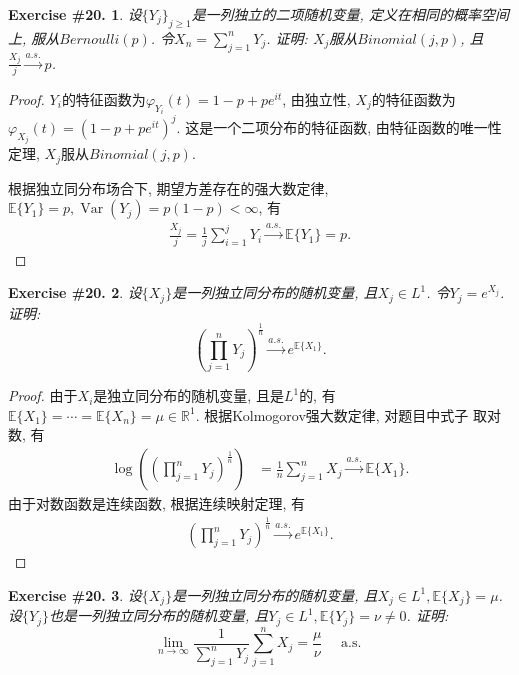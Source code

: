 \documentclass[UTF8, a4paper]{article}
\newtheorem{exercise}{Exercise \#20.}
\begin{document}
\begin{framed}
\begin{exercise}
设\(\{Y_j\}_{j\geq 1}\)是一列独立的二项随机变量, 定义在相同的概率空间上, 服从\(Bernoulli(p)\). 令\(X_n = \sum_{j = 1}^{n} Y_j\).
证明: \(X_j\)服从\(Binomial(j, p)\), 且\(\frac{X_j}{j} \xrightarrow{a.s.} p\).
\end{exercise}
\end{framed}

\begin{proof}
\(Y_i\)的特征函数为\(\varphi_{Y_i}(t) = 1 - p + pe^{it}\), 由独立性, \(X_j\)的特征函数为\(\varphi_{X_j}(t) = \left(1 - p + pe^{it}\right)^j\).
这是一个二项分布的特征函数, 由特征函数的唯一性定理, \(X_j\)服从\(Binomial(j, p)\).

根据独立同分布场合下, 期望方差存在的强大数定律, \(\mathbb{E}\{Y_1\} = p, \operatorname{Var}(Y_j) = p(1-p) < \infty\), 有
\begin{align*}
    \frac{X_j}{j} = \frac{1}{j}\sum_{i=1}^{j}Y_i \xrightarrow{a.s.} \mathbb{E}\{Y_1\} = p.
\end{align*}
\end{proof}


\begin{framed}
\begin{exercise}
设\(\{X_j\}\)是一列独立同分布的随机变量, 且\(X_j \in L^1\).
令\(Y_j = e^{X_j}\). 证明: 
$$
\left(\prod_{j=1}^n Y_j\right)^{\frac{1}{n}} \xrightarrow{a.s.} e^{\mathbb{E}\{X_1\}}.
$$
\end{exercise}
\end{framed}


\begin{proof}
    由于\(X_i\)是独立同分布的随机变量, 且是\(L^1\)的, 有\(\mathbb{E}\{X_1\} = \cdots = \mathbb{E}\{X_n\} = \mu \in \mathbb{R}^1\).
    根据Kolmogorov强大数定律, 对题目中式子
取对数, 有
\begin{align*}
    \log\left(\left(\prod_{j=1}^n Y_j\right)^{\frac{1}{n}}\right) &= \frac{1}{n}\sum_{j=1}^{n}X_j \xrightarrow{a.s.} \mathbb{E}\{X_1\}.
\end{align*}
由于对数函数是连续函数, 根据连续映射定理, 有
\begin{align*}
    \left(\prod_{j=1}^n Y_j\right)^{\frac{1}{n}} \xrightarrow{a.s.} e^{\mathbb{E}\{X_1\}}.
\end{align*}
\end{proof}

\begin{framed}
\begin{exercise}
设\(\{X_j\}\)是一列独立同分布的随机变量, 且\(X_j \in L^1, \mathbb{E}\{X_j\} = \mu\).
设\(\{Y_j\}\)也是一列独立同分布的随机变量, 且\(Y_j \in L^1, \mathbb{E}\{Y_j\} = \nu \neq 0\).
证明: 
$$
\lim _{n \rightarrow \infty} \frac{1}{\sum_{j=1}^n Y_j} \sum_{j=1}^n X_j=\frac{\mu}{\nu} \quad \text { a.s. }
$$
\end{exercise}
\end{framed}
\end{document}
